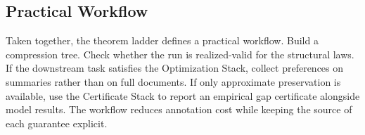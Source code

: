 \subsection{Practical Workflow}\label{app:practical-workflow}

Taken together, the theorem ladder defines a practical workflow. Build a compression tree. Check whether the run is realized-valid for the structural laws. If the downstream task satisfies the Optimization Stack, collect preferences on summaries rather than on full documents. If only approximate preservation is available, use the Certificate Stack to report an empirical gap certificate alongside model results. The workflow reduces annotation cost while keeping the source of each guarantee explicit.

